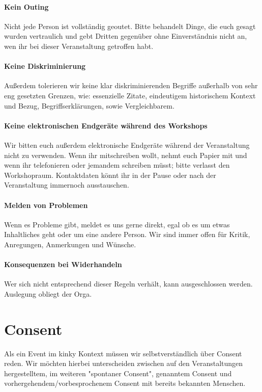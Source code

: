 \documentclass{article}
\begin{document}
\paragraph{\textcolor{PastelRed}{Kein Outing}}
Nicht jede Person ist vollständig geoutet. Bitte behandelt Dinge, die euch gesagt wurden vertraulich und gebt Dritten gegenüber ohne Einverständnis nicht an, wen ihr bei dieser Veranstaltung getroffen habt.
\paragraph{\textcolor{PastelRed}{Keine Diskriminierung}}
Außerdem tolerieren wir keine klar diskriminierenden Begriffe außerhalb von sehr eng gesetzten Grenzen, wie:  essenzielle Zitate, eindeutigem historischem Kontext und Bezug, Begriffserklärungen, sowie Vergleichbarem.
\paragraph{\textcolor{PastelRed}{Keine elektronischen Endgeräte während des Workshops}}
Wir bitten euch außerdem elektronische Endgeräte während der Veranstaltung nicht zu verwenden. Wenn ihr mitschreiben wollt, nehmt euch Papier mit und wenn ihr telefonieren oder jemandem schreiben müsst; bitte verlasst den Workshopraum. Kontaktdaten könnt ihr in der Pause oder nach der Veranstaltung immernoch ausstauschen.
\paragraph{\textcolor{PastelRed}{Melden von Problemen}}
Wenn es Probleme gibt, meldet es uns gerne direkt, egal ob es um etwas Inhaltliches geht oder um eine andere Person. Wir sind immer offen für Kritik, Anregungen, Anmerkungen und Wünsche.
\paragraph{\textcolor{PastelRed}{Konsequenzen bei Widerhandeln}}
Wer sich nicht entsprechend dieser Regeln verhält, kann ausgeschlossen werden. Auslegung obliegt der Orga.

\section{Consent}
Als ein Event im kinky Kontext müssen wir selbstverständlich über Consent reden. Wir möchten hierbei unterscheiden zwischen auf den Veranstaltungen hergestelltem, im weiteren "spontaner Consent", genanntem Consent und vorhergehendem/vorbesprochenem Consent mit bereits bekannten Menschen.
\end{document}
